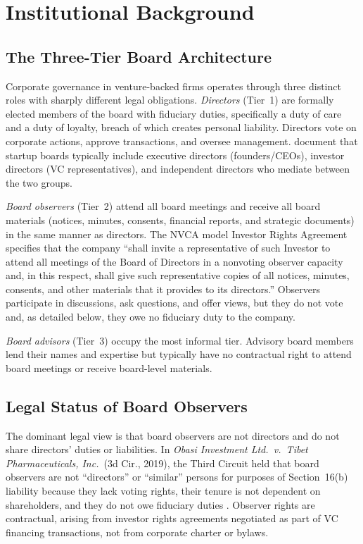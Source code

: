 \section{Institutional Background}
\label{sec:institutional}

\subsection{The Three-Tier Board Architecture}

Corporate governance in venture-backed firms operates through three distinct roles with sharply different legal obligations. \textit{Directors} (Tier~1) are formally elected members of the board with fiduciary duties, specifically a duty of care and a duty of loyalty, breach of which creates personal liability. Directors vote on corporate actions, approve transactions, and oversee management.  document that startup boards typically include executive directors (founders/CEOs), investor directors (VC representatives), and independent directors who mediate between the two groups.

\textit{Board observers} (Tier~2) attend all board meetings and receive all board materials (notices, minutes, consents, financial reports, and strategic documents) in the same manner as directors. The NVCA model Investor Rights Agreement specifies that the company ``shall invite a representative of such Investor to attend all meetings of the Board of Directors in a nonvoting observer capacity and, in this respect, shall give such representative copies of all notices, minutes, consents, and other materials that it provides to its directors.'' Observers participate in discussions, ask questions, and offer views, but they do not vote and, as detailed below, they owe no fiduciary duty to the company.

\textit{Board advisors} (Tier~3) occupy the most informal tier. Advisory board members lend their names and expertise but typically have no contractual right to attend board meetings or receive board-level materials.

\subsection{Legal Status of Board Observers}

The dominant legal view is that board observers are not directors and do not share directors' duties or liabilities. In \textit{Obasi Investment Ltd.\ v.\ Tibet Pharmaceuticals, Inc.}\ (3d Cir., 2019), the Third Circuit held that board observers are not ``directors'' or ``similar'' persons for purposes of Section~16(b) liability because they lack voting rights, their tenure is not dependent on shareholders, and they do not owe fiduciary duties \cite{packin2025board}. Observer rights are contractual, arising from investor rights agreements negotiated as part of VC financing transactions, not from corporate charter or bylaws.

